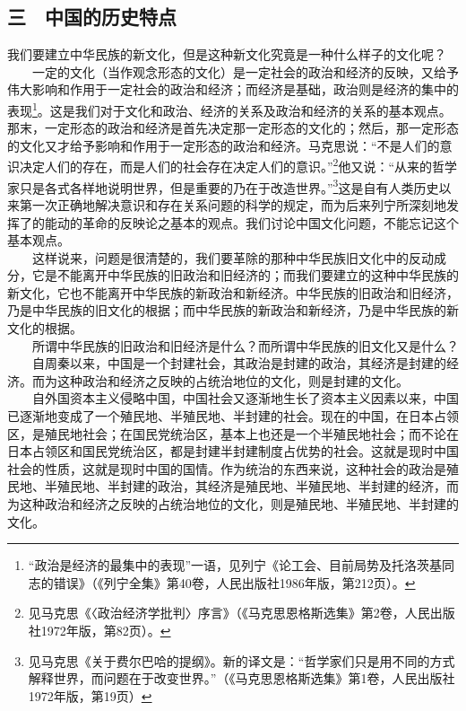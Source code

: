 \documentclass[cn,11pt,chinese]{elegantbook}
\def\myformat#1{\hfil\hfil #1}
\begin{document}
\subsection*{\myformat{三　中国的历史特点}}
我们要建立中华民族的新文化，但是这种新文化究竟是一种什么样子的文化呢？\\
　　一定的文化（当作观念形态的文化）是一定社会的政治和经济的反映，又给予伟大影响和作用于一定社会的政治和经济；而经济是基础，政治则是经济的集中的表现\footnote[2]{“政治是经济的最集中的表现”一语，见列宁《论工会、目前局势及托洛茨基同志的错误》（《列宁全集》第40卷，人民出版社1986年版，第212页）。}。这是我们对于文化和政治、经济的关系及政治和经济的关系的基本观点。那末，一定形态的政治和经济是首先决定那一定形态的文化的；然后，那一定形态的文化又才给予影响和作用于一定形态的政治和经济。马克思说：“不是人们的意识决定人们的存在，而是人们的社会存在决定人们的意识。”\footnote[3]{ 见马克思《〈政治经济学批判〉序言》（《马克思恩格斯选集》第2卷，人民出版社1972年版，第82页）。}他又说：“从来的哲学家只是各式各样地说明世界，但是重要的乃在于改造世界。”\footnote[4]{ 见马克思《关于费尔巴哈的提纲》。新的译文是：“哲学家们只是用不同的方式解释世界，而问题在于改变世界。”（《马克思恩格斯选集》第1卷，人民出版社1972年版，第19页）}这是自有人类历史以来第一次正确地解决意识和存在关系问题的科学的规定，而为后来列宁所深刻地发挥了的能动的革命的反映论之基本的观点。我们讨论中国文化问题，不能忘记这个基本观点。\\
　　这样说来，问题是很清楚的，我们要革除的那种中华民族旧文化中的反动成分，它是不能离开中华民族的旧政治和旧经济的；而我们要建立的这种中华民族的新文化，它也不能离开中华民族的新政治和新经济。中华民族的旧政治和旧经济，乃是中华民族的旧文化的根据；而中华民族的新政治和新经济，乃是中华民族的新文化的根据。\\
　　所谓中华民族的旧政治和旧经济是什么？而所谓中华民族的旧文化又是什么？\\
　　自周秦以来，中国是一个封建社会，其政治是封建的政治，其经济是封建的经济。而为这种政治和经济之反映的占统治地位的文化，则是封建的文化。\\
　　自外国资本主义侵略中国，中国社会又逐渐地生长了资本主义因素以来，中国已逐渐地变成了一个殖民地、半殖民地、半封建的社会。现在的中国，在日本占领区，是殖民地社会；在国民党统治区，基本上也还是一个半殖民地社会；而不论在日本占领区和国民党统治区，都是封建半封建制度占优势的社会。这就是现时中国社会的性质，这就是现时中国的国情。作为统治的东西来说，这种社会的政治是殖民地、半殖民地、半封建的政治，其经济是殖民地、半殖民地、半封建的经济，而为这种政治和经济之反映的占统治地位的文化，则是殖民地、半殖民地、半封建的文化。\\
\end{document}
